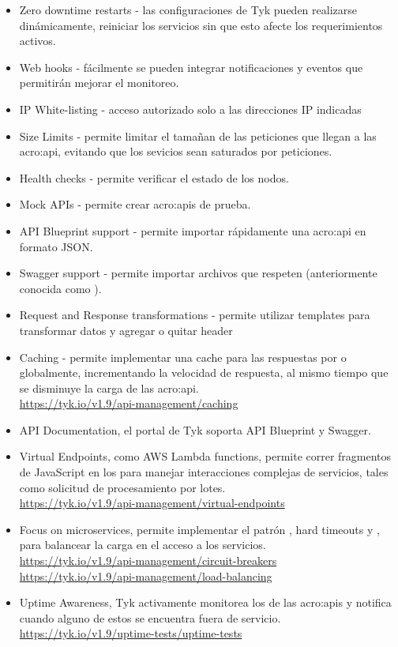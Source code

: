\begin{itemize}
  \item Zero downtime restarts - las configuraciones de Tyk pueden realizarse dinámicamente, reiniciar los servicios sin que esto afecte los requerimientos activos.
  \item Web hooks - fácilmente se pueden integrar notificaciones y eventos que permitirán mejorar el monitoreo.
  \item IP White-listing - acceso autorizado solo a las direcciones IP indicadas
  \item Size Limits - permite limitar el tamañan de las peticiones que llegan a las \gls{acro:api}, evitando que los sevicios sean saturados por peticiones.
  \item Health checks - permite verificar el estado de los nodos.
  \item Mock APIs - permite crear \glspl{acro:api} de prueba.
  \item API Blueprint support - permite importar rápidamente una \gls{acro:api} en formato JSON.
  \item Swagger support - permite importar archivos que respeten  (anteriormente conocida como ).
  \item Request and Response transformations - permite utilizar templates para transformar datos y agregar o quitar header 
  \item Caching - permite implementar una cache para las respuestas por  o globalmente, incrementando la velocidad de respuesta, al mismo tiempo que se disminuye la carga de las \gls{acro:api}. \\
  \url{https://tyk.io/v1.9/api-management/caching}
  \item API Documentation, el portal de Tyk soporta API Blueprint y Swagger.
  \item Virtual Endpoints, como AWS Lambda functions, permite correr fragmentos de JavaScript en los  para manejar interacciones complejas de servicios, tales como solicitud de procesamiento por lotes. \\
  \url{https://tyk.io/v1.9/api-management/virtual-endpoints}
  \item Focus on microservices, permite implementar el patrón , hard timeouts y , para balancear la carga en el acceso a los servicios. \\
  \url{https://tyk.io/v1.9/api-management/circuit-breakers} \\
  \url{https://tyk.io/v1.9/api-management/load-balancing}
  \item Uptime Awareness, Tyk activamente monitorea los  de las \glspl{acro:api} y notifica cuando alguno de estos se encuentra fuera de servicio. \\
  \url{https://tyk.io/v1.9/uptime-tests/uptime-tests}
\end{itemize}


